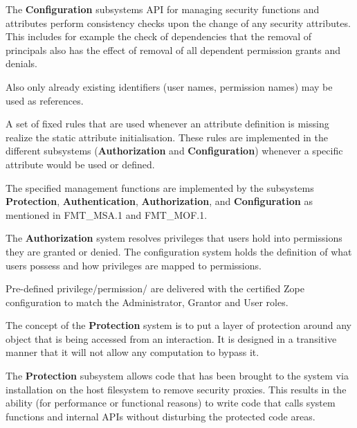 \documentclass[12pt,english]{scrbook}
\begin{document}

The \textbf{Configuration} subsystems API for managing security functions and
attributes perform consistency checks upon the change of any security
attributes. This includes for example the check of dependencies that the
removal of principals also has the effect of removal of all dependent
permission grants and denials. 

Also only already existing identifiers (user names, permission names) may 
be used as references.


A set of fixed rules that are used whenever an attribute definition is missing
realize the static attribute initialisation. These rules are implemented in the
different subsystems (\textbf{Authorization} and \textbf{Configuration})
whenever a specific attribute would be used or defined.


The specified management functions are implemented by the subsystems
\textbf{Protection}, \textbf{Authentication}, \textbf{Authorization}, and
\textbf{Configuration} as mentioned in FMT\_MSA.1 and FMT\_MOF.1.



The \textbf{Authorization} system resolves privileges that users hold into
permissions they are granted or denied. The configuration system holds the
definition of what users possess and how privileges are mapped to permissions.

Pre-defined privilege/permission/ are delivered with the certified Zope
configuration to match the Administrator, Grantor and User roles.


The concept of the \textbf{Protection} system is to put a layer of protection
around any object that is being accessed from an interaction. It is designed
in a transitive manner that it will not allow any computation to bypass it.


The \textbf{Protection} subsystem allows code that has been brought to the
system via installation on the host filesystem to remove security proxies. This
results in the ability (for performance or functional reasons) to write code
that calls system functions and internal APIs without disturbing the protected
code areas.
\end{document}
